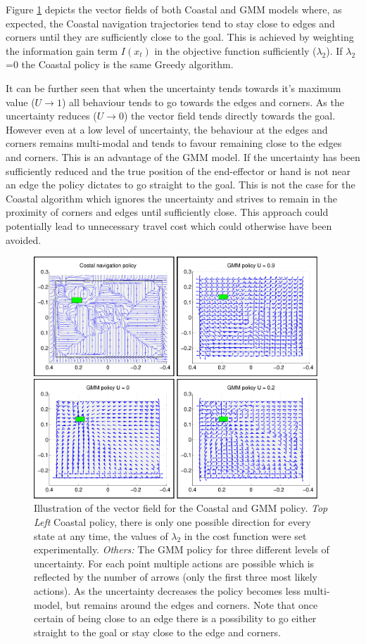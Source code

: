 Figure \ref{fig:vectorfield} depicts the vector fields of both Coastal and GMM models where, as expected, the Coastal navigation 
trajectories tend to stay close to edges and corners until they are sufficiently close to the goal. This is achieved by weighting 
the information gain term $I(x_t)$ in the objective function sufficiently ($\lambda_2$). If $\lambda_2$=0 the Coastal policy is 
the same Greedy algorithm. 

It can be further seen that when the uncertainty tends towards it's maximum value ($U \rightarrow 1$) 
all behaviour tends to go towards the edges and corners. As the uncertainty reduces ($U \rightarrow 0$) the vector field 
tends directly towards the goal. However even at a low level of uncertainty, the behaviour at the edges and corners remains 
multi-modal and tends to favour remaining close to the edges and corners. 
This is an advantage of the GMM model. If the uncertainty has been sufficiently reduced and 
the true position of the end-effector or hand is not near an 
edge the policy dictates to go straight to the goal. This is not the case for the Coastal algorithm which ignores the 
uncertainty and strives to remain in the proximity of corners and edges until sufficiently close. 
This approach could potentially lead to unnecessary travel cost which could otherwise have been avoided.

\begin{figure}
  \centering
  \includegraphics[width=0.95\textwidth]{./ch3-Search/Figures/Figure10}
  \caption{Illustration of the vector field for the Coastal and GMM policy. \textit{Top Left} Coastal policy, there is only one possible direction for every 
  state at any time, the values of $\lambda_2$ in the cost function were set experimentally. \textit{Others:} The GMM policy for three different levels of
  uncertainty. For each point multiple actions are possible which is reflected by the number of arrows (only the first three most likely actions). As 
  the uncertainty decreases the policy becomes less multi-model, but remains around the edges and corners. Note that once certain
  of being close to an edge there is a possibility to go either straight to the goal or stay close to the edge and corners.}
  \label{fig:vectorfield}
\end{figure}

